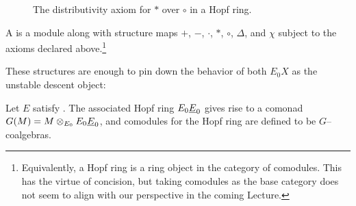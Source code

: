 \begin{figure}
\begin{center}
\end{center}
\caption{The distributivity axiom for \(\ast\) over \(\circ\) in a Hopf ring.}\label{DistributivityDiagram}
\end{figure}

\begin{definition}
A  is a module along with structure maps \(+\), \(-\), \(\cdot\), \(\ast\), \(\circ\), \(\Delta\), and \(\chi\) subject to the axioms declared above.\footnote{Equivalently, a Hopf ring is a ring object in the category of comodules.  This has the virtue of concision, but taking comodules as the base category does not seem to align with our perspective in the coming Lecture.}
\end{definition}

These structures are enough to pin down the behavior of both \(E_0 X\) as the unstable descent object:

\begin{definition}
Let \(E\) satisfy {\UFH}.  The associated Hopf ring \(E_0 \underline{\smash{E}}_{0}\) gives rise to a comonad \(G(M) = M \otimes_{E_0} E_0 \underline{\smash{E}}_{0}\), and comodules for the Hopf ring are defined to be \(G\)--coalgebras.
\end{definition}

